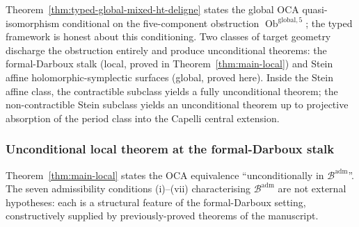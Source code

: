 Theorem~\ref{thm:typed-global-mixed-ht-deligne} states the global OCA
quasi-isomorphism conditional on the five-component obstruction
\(\operatorname{Ob}^{\mathrm{global,5}}\); the typed framework is
honest about this conditioning.  Two classes of target geometry
discharge the obstruction entirely and produce unconditional theorems:
the formal-Darboux stalk (local, proved in
Theorem~\ref{thm:main-local}) and Stein affine holomorphic-symplectic
surfaces (global, proved here).  Inside the Stein affine class, the
contractible subclass yields a fully unconditional theorem; the
non-contractible Stein subclass yields an unconditional theorem up to
projective absorption of the period class into the Capelli central
extension.

\subsubsection{Unconditional local theorem at the formal-Darboux stalk}
\label{sssec:unconditional-local}

Theorem~\ref{thm:main-local} states the OCA equivalence
``unconditionally in \(\mathcal B^{\mathrm{adm}}\)''.  The seven
admissibility conditions (i)--(vii) characterising
\(\mathcal B^{\mathrm{adm}}\) are not external hypotheses: each is a
structural feature of the formal-Darboux setting, constructively
supplied by previously-proved theorems of the manuscript.


